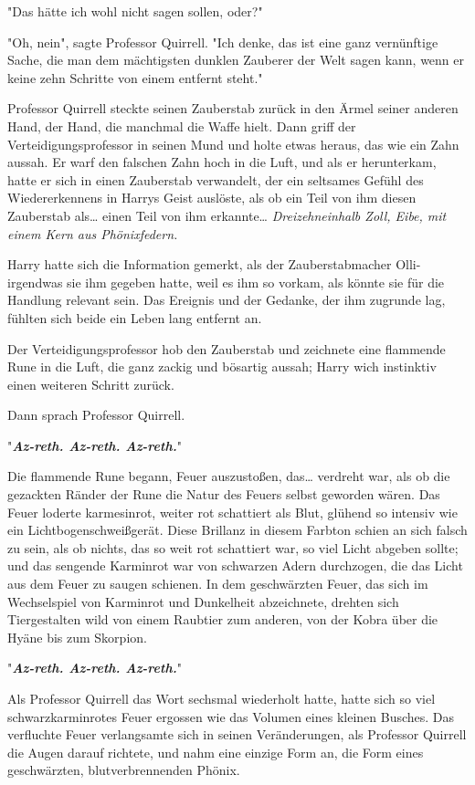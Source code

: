 {"Das hätte ich wohl nicht sagen sollen, oder?"

"Oh, nein", sagte Professor Quirrell. "Ich denke, das ist eine ganz vernünftige Sache, die man dem mächtigsten dunklen Zauberer der Welt sagen kann, wenn er keine zehn Schritte von einem entfernt steht."

Professor Quirrell steckte seinen Zauberstab zurück in den Ärmel seiner anderen Hand, der Hand, die manchmal die Waffe hielt. Dann griff der Verteidigungsprofessor in seinen Mund und holte etwas heraus, das wie ein Zahn aussah. Er warf den falschen Zahn hoch in die Luft, und als er herunterkam, hatte er sich in einen Zauberstab verwandelt, der ein seltsames Gefühl des Wiedererkennens in Harrys Geist auslöste, als ob ein Teil von ihm diesen Zauberstab als… einen Teil von ihm erkannte… \emph{Dreizehneinhalb Zoll, Eibe, mit einem Kern aus Phönixfedern.}

Harry hatte sich die Information gemerkt, als der Zauberstabmacher Olli-irgendwas sie ihm gegeben hatte, weil es ihm so vorkam, als könnte sie für die Handlung relevant sein. Das Ereignis und der Gedanke, der ihm zugrunde lag, fühlten sich beide ein Leben lang entfernt an.

Der Verteidigungsprofessor hob den Zauberstab und zeichnete eine flammende Rune in die Luft, die ganz zackig und bösartig aussah; Harry wich instinktiv einen weiteren Schritt zurück.

Dann sprach Professor Quirrell.

"\textbf{\emph{Az-reth. Az-reth. Az-reth.}}"

Die flammende Rune begann, Feuer auszustoßen, das… verdreht war, als ob die gezackten Ränder der Rune die Natur des Feuers selbst geworden wären. Das Feuer loderte karmesinrot, weiter rot schattiert als Blut, glühend so intensiv wie ein Lichtbogenschweißgerät. Diese Brillanz in diesem Farbton schien an sich falsch zu sein, als ob nichts, das so weit rot schattiert war, so viel Licht abgeben sollte; und das sengende Karminrot war von schwarzen Adern durchzogen, die das Licht aus dem Feuer zu saugen schienen. In dem geschwärzten Feuer, das sich im Wechselspiel von Karminrot und Dunkelheit abzeichnete, drehten sich Tiergestalten wild von einem Raubtier zum anderen, von der Kobra über die Hyäne bis zum Skorpion.

"\textbf{\emph{Az-reth. Az-reth. Az-reth.}}"

Als Professor Quirrell das Wort sechsmal wiederholt hatte, hatte sich so viel schwarzkarminrotes Feuer ergossen wie das Volumen eines kleinen Busches. Das verfluchte Feuer verlangsamte sich in seinen Veränderungen, als Professor Quirrell die Augen darauf richtete, und nahm eine einzige Form an, die Form eines geschwärzten, blutverbrennenden Phönix.

}
